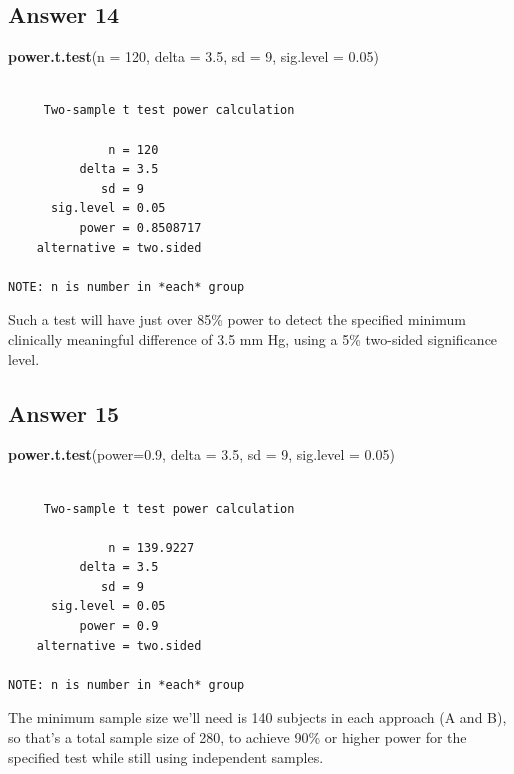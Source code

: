 \documentclass[
]{book}
\newenvironment{Shaded}{\begin{snugshade}}{\end{snugshade}}
\newcommand{\DataTypeTok}[1]{\textcolor[rgb]{0.13,0.29,0.53}{#1}}
\newcommand{\DecValTok}[1]{\textcolor[rgb]{0.00,0.00,0.81}{#1}}
\newcommand{\FloatTok}[1]{\textcolor[rgb]{0.00,0.00,0.81}{#1}}
\newcommand{\KeywordTok}[1]{\textcolor[rgb]{0.13,0.29,0.53}{\textbf{#1}}}
\newcommand{\NormalTok}[1]{#1}
\begin{document}
\hypertarget{answer-14}{%
\subsection{Answer 14}\label{answer-14}}

\begin{Shaded}
\begin{Highlighting}[]
\KeywordTok{power.t.test}\NormalTok{(}\DataTypeTok{n =} \DecValTok{120}\NormalTok{, }\DataTypeTok{delta =} \FloatTok{3.5}\NormalTok{, }\DataTypeTok{sd =} \DecValTok{9}\NormalTok{, }\DataTypeTok{sig.level =} \FloatTok{0.05}\NormalTok{)}
\end{Highlighting}
\end{Shaded}

\begin{verbatim}

     Two-sample t test power calculation 

              n = 120
          delta = 3.5
             sd = 9
      sig.level = 0.05
          power = 0.8508717
    alternative = two.sided

NOTE: n is number in *each* group
\end{verbatim}

Such a test will have just over 85\% power to detect the specified minimum clinically meaningful difference of 3.5 mm Hg, using a 5\% two-sided significance level.

\hypertarget{answer-15}{%
\subsection{Answer 15}\label{answer-15}}

\begin{Shaded}
\begin{Highlighting}[]
\KeywordTok{power.t.test}\NormalTok{(}\DataTypeTok{power=}\FloatTok{0.9}\NormalTok{, }\DataTypeTok{delta =} \FloatTok{3.5}\NormalTok{, }\DataTypeTok{sd =} \DecValTok{9}\NormalTok{, }\DataTypeTok{sig.level =} \FloatTok{0.05}\NormalTok{)}
\end{Highlighting}
\end{Shaded}

\begin{verbatim}

     Two-sample t test power calculation 

              n = 139.9227
          delta = 3.5
             sd = 9
      sig.level = 0.05
          power = 0.9
    alternative = two.sided

NOTE: n is number in *each* group
\end{verbatim}

The minimum sample size we'll need is 140 subjects in each approach (A and B), so that's a total sample size of 280, to achieve 90\% or higher power for the specified test while still using independent samples.

  
\end{document}

